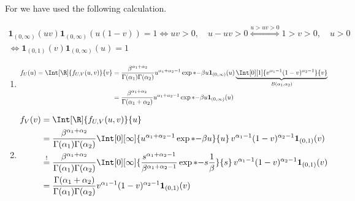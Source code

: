 \begin{solution}
For \Quote{$!$} we have used the following calculation.

\begin{multline*}
    \mathbf 1_{(0, \infty)}(u v) \mathbf 1_{(0, \infty)}(u (1 - v)) = 1
    \iff
    u v > 0, \quad u - u v > 0
    \stackrel
    {
        u > u v > 0
    }{\iff}
    1 > v > 0, \quad u > 0 \\
    \iff
    \mathbf 1_{(0, 1)}(v) \mathbf 1_{(0, \infty)}(u) = 1
\end{multline*}

\begin{enumerate}[label = (\alph*)]

    \item

    \begin{multline*}
        f_U(u)
        =
        \Int[\R]{f_{U, V}(u, v)}{v}
        =
        \frac{\beta^{\alpha_1 + \alpha_2}}{\Gamma(\alpha_1) \Gamma(\alpha_2)}
        u^{\alpha_1 + \alpha_2 - 1}
        \exp*{-\beta u}
        \mathbf 1_{(0, \infty)}(u)
        \underbrace
        {
            \Int[0][1]
            {
                v^{\alpha_1 - 1}
                (1 - v)^{\alpha_2 - 1}
            }{v}
        }_{
            B(\alpha_1, \alpha_2)
        } \\
        =
        \frac{\beta^{\alpha_1 + \alpha_2}}{\Gamma(\alpha_1 + \alpha_2)}
        u^{\alpha_1 + \alpha_2 - 1}
        \exp*{-\beta u}
        \mathbf 1_{(0, \infty)}(u)
    \end{multline*}

    \item

    \begin{align*}
        f_V(v)
        & =
        \Int[\R]{f_{U, V}(u, v)}{u} \\
        & =
        \frac{\beta^{\alpha_1 + \alpha_2}}{\Gamma(\alpha_1) \Gamma(\alpha_2)}
        \Int[0][\infty]
        {
            u^{\alpha_1 + \alpha_2 - 1}
            \exp*{-\beta u}
        }{u} \,
        v^{\alpha_1 - 1}
        (1 - v)^{\alpha_2 - 1}
        \mathbf 1_{(0, 1)}(v) \\
        & \stackrel{!}{=}
        \frac{\beta^{\alpha_1 + \alpha_2}}{\Gamma(\alpha_1) \Gamma(\alpha_2)}
        \Int[0][\infty]
        {
            \frac{s^{\alpha_1 + \alpha_2 - 1}}{\beta^{\alpha_1 + \alpha_2 - 1}}
            \exp*{-s}
            \frac{1}{\beta}
        }{s} \,
        v^{\alpha_1 - 1}
        (1 - v)^{\alpha_2 - 1}
        \mathbf 1_{(0, 1)}(v) \\
        & =
        \frac{\Gamma(\alpha_1 + \alpha_2)}{\Gamma(\alpha_1) \Gamma(\alpha_2)}
        v^{\alpha_1 - 1}
        (1 - v)^{\alpha_2 - 1}
        \mathbf 1_{(0, 1)}(v)
    \end{align*}


\end{enumerate}
\end{solution}
